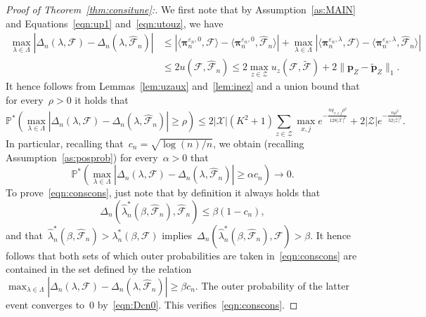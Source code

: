 \documentclass[11pt, a4paper]{article}
\theoremstyle{definition}
\begin{document}
\begin{proof}[Proof of Theorem~\ref{thm:consitune}:]
We first note that by Assumption~\ref{as:MAIN} and Equations~\eqref{eqn:up1} and~\eqref{eqn:utouz}, we have
%
\begin{align*}
\max_{\lambda \in \Lambda} |\Delta_n(\lambda, \mathcal{F}) - \Delta_n(\lambda, \hat{\mathcal{F}}_n)| &\leq |\langle \bm{\pi}_{n}^{\varepsilon_n, 0}, \mathcal{F} \rangle - \langle \bm{\pi}_{n}^{\varepsilon_n, 0}, \hat{\mathcal{F}}_n \rangle| + \max_{\lambda \in \Lambda} |\langle \bm{\pi}_{n}^{\varepsilon_n, \lambda}, \mathcal{F} \rangle  - \langle \bm{\pi}_{n}^{\varepsilon_n, \lambda}, \hat{\mathcal{F}}_n\rangle | \\
&\leq 2u(\mathcal{F}, \hat{\mathcal{F}}_n) \leq 2 \max_{z \in \mathcal{Z}} u_z(\mathcal{F}, \tilde{\mathcal{F}}) + 2\|\bm{p}_Z - \tilde{\bm{p}}_Z\|_1.
\end{align*}
%
It hence follows from Lemmas~\ref{lem:uzaux} and~\ref{lem:inez} and a union bound that for every~$\rho > 0$ it holds that
%
\begin{equation*}
\mathbb{P}^*\left(\max_{\lambda \in \Lambda}|\Delta_n(\lambda, \mathcal{F}) - \Delta_n(\lambda, \hat{\mathcal{F}}_n)| \geq \rho \right) \leq  2 |\mathcal{X}|
\left(K^2 + 1\right) \sum_{z \in \mathcal{Z}}  \max_{x, j}  e^{-\frac{nq_{x,z,j} \rho^2}{128 |\mathcal{X}|^2 }} + 2 |\mathcal{Z}| e^{-\frac{n\rho^2}{32 |\mathcal{Z}|^2}}.
\end{equation*}
%
In particular, recalling that~$c_n = \sqrt{\log(n)/n}$, we obtain (recalling Assumption~\ref{as:posprob}) for every~$\alpha > 0$ that
%
\begin{equation}\label{eqn:Dcn0}
\mathbb{P}^*\left(\max_{\lambda \in \Lambda}|\Delta_n(\lambda, \mathcal{F}) - \Delta_n(\lambda, \hat{\mathcal{F}}_n)| \geq \alpha c_n \right) \to 0.
\end{equation}
%
To prove~\eqref{eqn:conscons}, just note that by definition it always holds that $$\Delta_n(\hat{\lambda}_n^*(\beta, \hat{\mathcal{F}}_n), \hat{\mathcal{F}}_n) \leq \beta(1 - c_n),$$ and that~$\hat{\lambda}_n^*(\beta, \hat{\mathcal{F}}_n) > \lambda_n^*(\beta, \mathcal{F})$ implies~$\Delta_n(\hat{\lambda}_n^*(\beta, \hat{\mathcal{F}}_n), \mathcal{F}) > \beta$. It hence follows that both sets of which outer probabilities are taken in~\eqref{eqn:conscons} are contained in the set defined by the relation~$\max_{\lambda \in \Lambda}|\Delta_n(\lambda, \mathcal{F}) - \Delta_n(\lambda, \hat{\mathcal{F}}_n)| \geq \beta c_n$. The outer probability of the latter event converges to~$0$ by~\eqref{eqn:Dcn0}. This verifies~\eqref{eqn:conscons}.


\end{proof}
\end{document}
